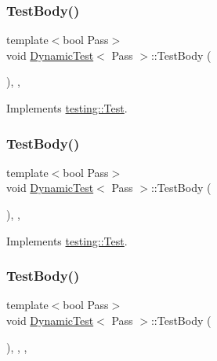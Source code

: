 \subsubsection{\texorpdfstring{TestBody()}{TestBody()}\hspace{0.1cm}{\footnotesize\ttfamily [1/4]}}
{\footnotesize\ttfamily template$<$bool Pass$>$ \\
void \mbox{\hyperlink{class_dynamic_test}{Dynamic\+Test}}$<$ Pass $>$\+::Test\+Body (\begin{DoxyParamCaption}{ }\end{DoxyParamCaption})\hspace{0.3cm}{\ttfamily [inline]}, {\ttfamily [override]}, {\ttfamily [virtual]}}



Implements \mbox{\hyperlink{classtesting_1_1_test_a146a4a5d9854e676d625a0ef67409794}{testing\+::\+Test}}.

\mbox{\label{class_dynamic_test_afc4a0a94673a3d37709f9cd03e82b821}} 
\subsubsection{\texorpdfstring{TestBody()}{TestBody()}\hspace{0.1cm}{\footnotesize\ttfamily [2/4]}}
{\footnotesize\ttfamily template$<$bool Pass$>$ \\
void \mbox{\hyperlink{class_dynamic_test}{Dynamic\+Test}}$<$ Pass $>$\+::Test\+Body (\begin{DoxyParamCaption}{ }\end{DoxyParamCaption})\hspace{0.3cm}{\ttfamily [inline]}, {\ttfamily [override]}, {\ttfamily [virtual]}}



Implements \mbox{\hyperlink{classtesting_1_1_test_a146a4a5d9854e676d625a0ef67409794}{testing\+::\+Test}}.

\mbox{\label{class_dynamic_test_afc4a0a94673a3d37709f9cd03e82b821}} 
\subsubsection{\texorpdfstring{TestBody()}{TestBody()}\hspace{0.1cm}{\footnotesize\ttfamily [3/4]}}
{\footnotesize\ttfamily template$<$bool Pass$>$ \\
void \mbox{\hyperlink{class_dynamic_test}{Dynamic\+Test}}$<$ Pass $>$\+::Test\+Body (\begin{DoxyParamCaption}{ }\end{DoxyParamCaption})\hspace{0.3cm}{\ttfamily [inline]}, {\ttfamily [override]}, {\ttfamily [private]}, {\ttfamily [virtual]}}



